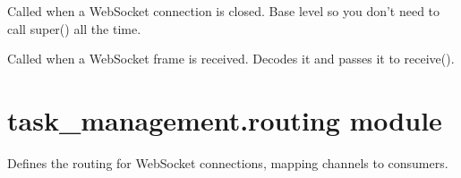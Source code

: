 \documentclass[letterpaper,10pt,english]{sphinxmanual}
\begin{document}
\begin{fulllineitems}
\begin{fulllineitems}
\end{fulllineitems}


\begin{fulllineitems}
\label{\detokenize{task_management:task_management.consumers.TaskConsumer.websocket_disconnect}}
\pysigstartsignatures
{}
\pysigstopsignatures
\sphinxAtStartPar
Called when a WebSocket connection is closed. Base level so you don’t
need to call super() all the time.

\end{fulllineitems}


\begin{fulllineitems}
\label{\detokenize{task_management:task_management.consumers.TaskConsumer.websocket_receive}}
\pysigstartsignatures
{}
\pysigstopsignatures
\sphinxAtStartPar
Called when a WebSocket frame is received. Decodes it and passes it
to receive().

\end{fulllineitems}


\end{fulllineitems}



\section{task\_management.routing module}
\label{\detokenize{task_management:task-management-routing-module}}
\sphinxAtStartPar
Defines the routing for WebSocket connections, mapping channels to consumers.
\end{document}
